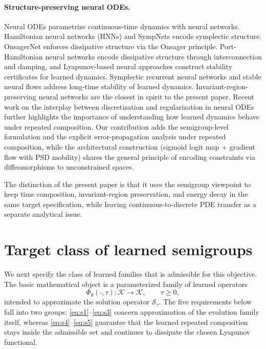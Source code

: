 \documentclass[hidelinks,review,nohypdvips,onefignum,onetabnum]{siamart220329}
\newcommand{\cS}{\mathcal{S}}
\newcommand{\cK}{\mathcal{K}}
\newcommand{\PhiT}{\Phi_{\theta}}
\begin{document}
\paragraph{Structure-preserving neural ODEs.}
Neural ODEs \cite{ChenRubanovaBettencourtDuvenaud2018NODE,KidgerMorrilFoster2020NeuralDE,DupontDoucetTeh2019} parametrize continuous-time dynamics with neural networks. Hamiltonian neural networks (HNNs) \cite{GreydanusDzambaYosinski2019HNN} and SympNets \cite{JinZhangZhuTangKarniadakis2020SympNets} encode symplectic structure. OnsagerNet \cite{YuTianELi2021OnsagerNet} enforces dissipative structure via the Onsager principle. Port-Hamiltonian neural networks \cite{Desjardins2024PHNN} encode dissipative structure through interconnection and damping, and Lyapunov-based neural approaches construct stability certificates for learned dynamics. Symplectic recurrent neural networks \cite{ZhongDeySusmelj2020SympRNN} and stable neural flows \cite{MassaroliPoliPark2020StableFlows} address long-time stability of learned dynamics. Invariant-region-preserving neural networks \cite{LiuGomezSuli2022InvariantRegion} are the closest in spirit to the present paper. Recent work on the interplay between discretization and regularization in neural ODEs \cite{GeshkovskiRigollet2025NeuralODE} further highlights the importance of understanding how learned dynamics behave under repeated composition. Our contribution adds the semigroup-level formulation and the explicit error-propagation analysis under repeated composition, while the architectural construction (sigmoid logit map + gradient flow with PSD mobility) shares the general principle of encoding constraints via diffeomorphisms to unconstrained spaces.

The distinction of the present paper is that it uses the semigroup viewpoint to keep time composition, invariant-region preservation, and energy decay in the same target specification, while leaving continuous-to-discrete PDE transfer as a separate analytical issue.

\section{Target class of learned semigroups}\label{sec:target-class}
We next specify the class of learned families that is admissible for this objective. The basic mathematical object is a parameterized family of learned operators
\begin{equation}\label{eq:learned-family}
\PhiT(\cdot,\tau) : \cK \to \cK, \qquad \tau\ge 0,
\end{equation}
intended to approximate the solution operator \(\cS_{\tau}\). The five requirements below fall into two groups: \eqref{eq:s1}--\eqref{eq:s3} concern approximation of the evolution family itself, whereas \eqref{eq:s4}--\eqref{eq:s5} guarantee that the learned repeated composition stays inside the admissible set and continues to dissipate the chosen Lyapunov functional.
\end{document}
